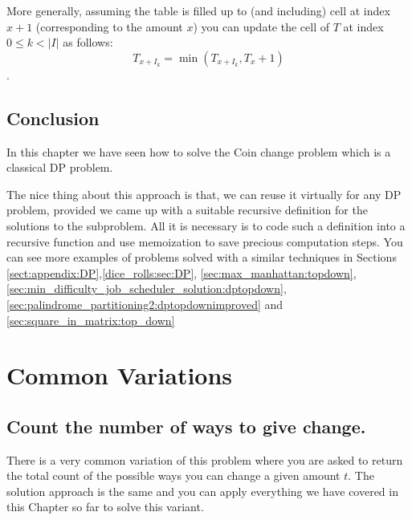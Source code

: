 More generally, assuming the table is filled up to (and including) cell at index $x+1$ (corresponding to the amount $x$)
you can update the cell of $T$ at index $0 \leq k < |I|$ as follows: $$T_{x+I_k} = \min (T_{x+I_k}, T_{x}+1)$$.



\subsection{Conclusion}
In this chapter we have seen how to solve the Coin change problem which is a classical DP problem. 

The nice thing about this approach is that, we can reuse it virtually for any DP problem, provided we came up with a suitable recursive definition for the solutions to the subproblem.  All it is necessary is to code such a definition into a recursive function and use memoization to save precious computation steps. You can see more examples of problems solved with a similar techniques in Sections \ref{sect:appendix:DP},\ref{dice_rolls:sec:DP}, \ref{sec:max_manhattan:topdown}, \ref{sec:min_difficulty_job_scheduler_solution:dptopdown}, 
\ref{sec:palindrome_partitioning2:dptopdownimproved} and \ref{sec:square_in_matrix:top_down}

\section{Common Variations}

\subsection{Count the number of ways to give change.}
There is a very common variation of this problem where you are asked to return the total count of the possible ways you can change a given amount $t$. The solution approach
is the same and you can apply everything we have covered in this Chapter so far to solve this variant. 

